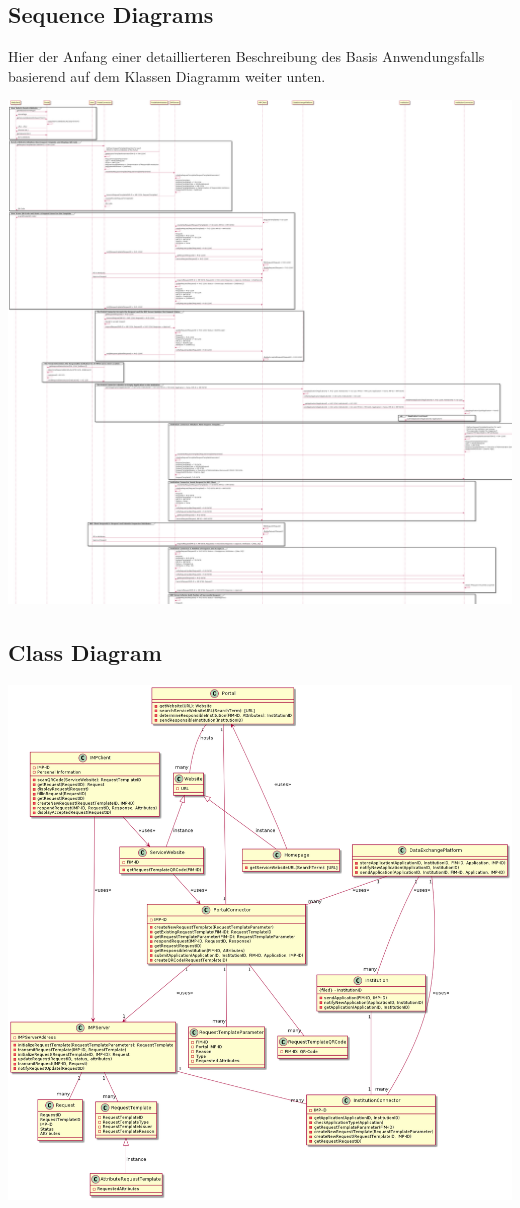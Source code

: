 \documentclass[
     12pt,         %
     a4paper,      %
     BCOR=10mm,version=first,     %
     DIV=14,version=first,        %
     ]{scrreprt}
\begin{document}
\subsection{Sequence Diagrams}

Hier der Anfang einer detaillierteren Beschreibung des Basis Anwendungsfalls basierend auf dem Klassen Diagramm weiter unten.

\includegraphics[width=15cm]{Diagrams/out/Sequence Diagram/Sequence Diagram.png}

\subsection{Class Diagram}

\includegraphics[width=15cm]{Diagrams/out/Class Diagram/Class Diagram.png}
\end{document}
